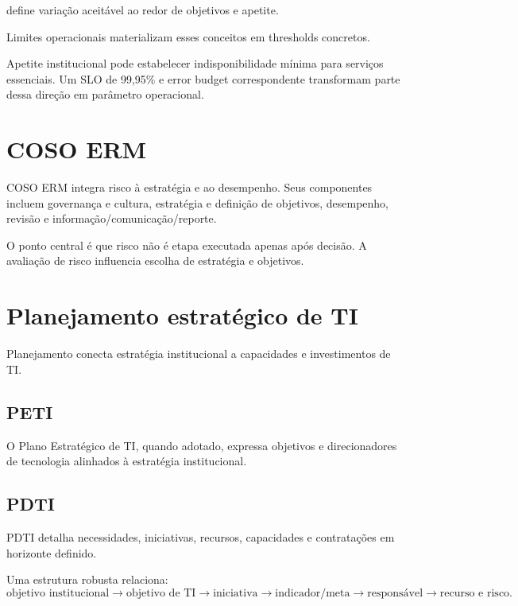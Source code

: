  define variação aceitável ao redor de objetivos e apetite.

Limites operacionais materializam esses conceitos em thresholds concretos.

\begin{exemplo}
Apetite institucional pode estabelecer indisponibilidade mínima para serviços essenciais. Um SLO de 99,95\% e error budget correspondente transformam parte dessa direção em parâmetro operacional.
\end{exemplo}

\section{COSO ERM}

COSO ERM integra risco à estratégia e ao desempenho. Seus componentes incluem governança e cultura, estratégia e definição de objetivos, desempenho, revisão e informação/comunicação/reporte.

O ponto central é que risco não é etapa executada apenas após decisão. A avaliação de risco influencia escolha de estratégia e objetivos.

\section{Planejamento estratégico de TI}

Planejamento conecta estratégia institucional a capacidades e investimentos de TI.

\subsection{PETI}

O Plano Estratégico de TI, quando adotado, expressa objetivos e direcionadores de tecnologia alinhados à estratégia institucional.

\subsection{PDTI}

PDTI detalha necessidades, iniciativas, recursos, capacidades e contratações em horizonte definido.

Uma estrutura robusta relaciona:
\[
\text{objetivo institucional}
\rightarrow
\text{objetivo de TI}
\rightarrow
\text{iniciativa}
\rightarrow
\text{indicador/meta}
\rightarrow
\text{responsável}
\rightarrow
\text{recurso e risco}.
\]

